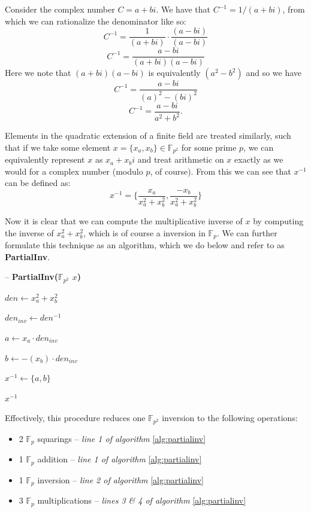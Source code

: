 Consider the complex number $C = a + bi$. We have that $C^{-1} = 1 / (a + bi)$, from which we can rationalize the denominator like so:\\
$$
C^{-1} = \frac {1}{(a + bi)} \cdot \frac{(a - bi)}{(a - bi)}
$$
$$
C^{-1} = \frac {a - bi}{(a + bi)(a - bi)}
$$
Here we note that $(a + bi)(a - bi)$ is equivalently $(a^2 - b^2)$ and so we have
$$
C^{-1} = \frac {a - bi}{(a)^2 - (bi)^2}
$$
$$
C^{-1} = \frac {a - bi}{a^2 + b^2}.
$$

Elements in the quadratic extension of a finite field are treated similarly, such that if we take some element $x = \{x_{a}, x_{b}\} \in \mathbb{F}_{p^{2}}$ for some prime $p$, we can equivalently represent $x$ as $x_{a} + x_{b}i$ and treat arithmetic on $x$ exactly as we would for a complex number (modulo $p$, of course). From this we can see that $x^{-1}$ can be defined as:
$$
x^{-1} = \{\frac {x_{a}}{x_{a}^2 + x_{b}^2}, \frac {-x_{b}}{x_{a}^2 + x_{b}^2}\}
$$

Now it is clear that we can compute the multiplicative inverse of $x$ by computing the inverse of $x_{a}^2 + x_{b}^2$, which is of course a inversion in $\mathbb{F}_{p}$. We can further formulate this technique as an algorithm,  which we do below and refer to as \textbf{PartialInv}.

\begin{algorithm}
\caption{-- \textbf{PartialInv($\mathbb{F}_{p^{2}}$ $x$)}}\label{alg:partialinv}
\begin{algorithmic}[1]
\State $den \gets x_{a}^{2} + x_{b}^{2}$

\State $den_{inv} \gets den^{-1}$

\State $a \gets x_{a} \cdot den_{inv}$

\State $b \gets -(x_{b}) \cdot den_{inv}$

\State $x^{-1} \gets \{a, b\}$

\State \Return $x^{-1}$
\end{algorithmic}
\end{algorithm}

Effectively, this procedure reduces one $\mathbb{F}_{p^{2}}$ inversion to the following operations: 

\begin{center}
\begin{itemize}
\item 2 $\mathbb{F}_{p}$ squarings -- \emph{line 1 of algorithm} \ref{alg:partialinv}
\item 1 $\mathbb{F}_{p}$ addition -- \emph{line 1 of algorithm} \ref{alg:partialinv}
\item 1 $\mathbb{F}_{p}$ inversion -- \emph{line 2 of algorithm} \ref{alg:partialinv}
\item 3 $\mathbb{F}_{p}$ multiplications -- \emph{lines 3 \& 4 of algorithm} \ref{alg:partialinv}
\end{itemize}
\end{center}

